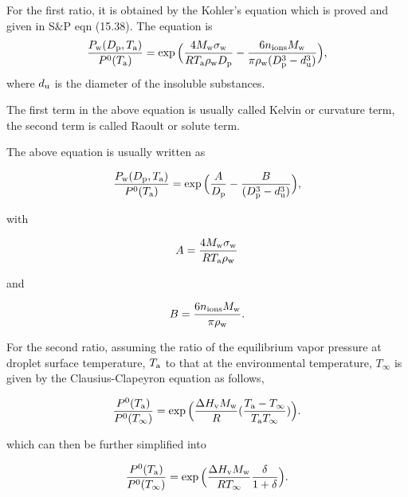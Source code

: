 \documentclass[12pt]{article}
\begin{document}
For the first ratio, it is obtained by the Kohler's equation which is proved and given in S$\&$P eqn (15.38). The equation is 
\begin{equation}\label{eqn:SP14a}
 \frac{P_{\rm w}(D_{\rm p}, T_{\rm a})}{P^{\rm 0}(T_{\rm a})}=\exp{\Big(\frac{4M_{\rm w} \sigma_{\rm w}}{RT_{\rm a}\rho_{\rm w}D_{\rm p}}-\frac{6n_{\rm ions}M_{\rm w}}{\pi \rho_{\rm w}(D_{\rm p}^{3}-d_{\rm u}^{3})}\Big)},
\end{equation} 
where $d_{\rm u}$ is the diameter of the insoluble substances.

The first term in the above equation is usually called Kelvin or curvature term, the second term is called Raoult or solute term.

The above equation is usually written as 

\begin{equation}\label{eqn:SP14b}
\frac{P_{\rm w}(D_{\rm p}, T_{\rm a})}{P^{\rm 0}(T_{\rm a})}=\exp{\Big(\frac{A}{D_{\rm p}}-\frac{B}{(D_{\rm p}^{3}-d_{\rm u}^{3})}\Big)},
\end{equation} 

with 

\begin{equation}\label{eqn:SP14c}
A=\frac{4 M_{\rm w}\sigma_{\rm w}} {R T_{\rm a} \rho_{\rm w}}
\end{equation}

and 

\begin{equation}\label{eqn:SP14d}
B=\frac{6 n_{\rm ions} M_{\rm w}}{\pi \rho_{\rm w}}.
\end{equation}


For the second ratio, assuming the ratio of the equilibrium vapor pressure at droplet surface temperature, $T_{\rm a}$ to that at the environmental temperature, $T_{\infty}$ is given by the Clausius-Clapeyron equation as follows,

\begin{equation}\label{eqn:SP15}
\frac{P^{\rm 0}(T_{\rm a})}{P^{\rm 0}(T_{\infty})}=\exp \Big(\frac{\Delta H_{\rm v} M_{\rm w}}{R} (\frac{T_{\rm a}-T_{\infty}}{T_{\rm a} T_{\infty}})\Big).
\end{equation}

which can then be further simplified into 

\begin{equation}\label{eqn:SP16}
\frac{P^{\rm 0}(T_{\rm a})}{P^{\rm 0}(T_{\infty})}=\exp \Big(\frac{\Delta H_{\rm v} M_{\rm w}}{R T_{\infty}} \frac{\delta}{1+\delta}\Big).
\end{equation}
\end{document}
